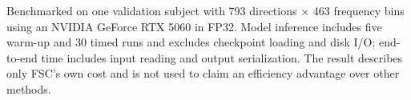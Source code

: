 \begin{table}[htbp]
\centering\scriptsize
\setlength{\tabcolsep}{3pt}
\caption{Model size and inference cost of FSC-Q26}
\label{tab:efficiency-results}
\par\smallskip
\parbox{\linewidth}{\footnotesize Benchmarked on one validation subject with 793 directions $\times$ 463 frequency bins using an NVIDIA GeForce RTX 5060 in FP32. Model inference includes five warm-up and 30 timed runs and excludes checkpoint loading and disk I/O; end-to-end time includes input reading and output serialization. The result describes only FSC's own cost and is not used to claim an efficiency advantage over other methods.}
\end{table}
